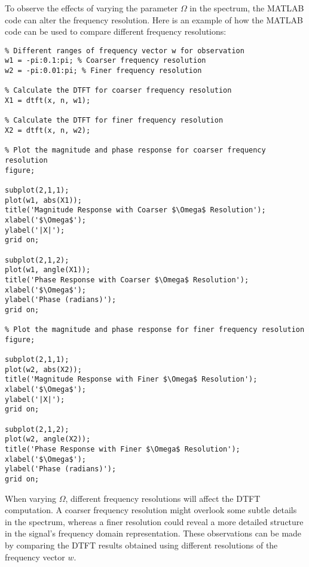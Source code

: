 
\item[(c)]
To observe the effects of varying the parameter $\Omega$ in the spectrum, the MATLAB code can alter the frequency resolution. Here is an example of how the MATLAB code can be used to compare different frequency resolutions:

\begin{verbatim}
% Different ranges of frequency vector w for observation
w1 = -pi:0.1:pi; % Coarser frequency resolution
w2 = -pi:0.01:pi; % Finer frequency resolution

% Calculate the DTFT for coarser frequency resolution
X1 = dtft(x, n, w1);

% Calculate the DTFT for finer frequency resolution
X2 = dtft(x, n, w2);

% Plot the magnitude and phase response for coarser frequency resolution
figure;

subplot(2,1,1);
plot(w1, abs(X1));
title('Magnitude Response with Coarser $\Omega$ Resolution');
xlabel('$\Omega$');
ylabel('|X|');
grid on;

subplot(2,1,2);
plot(w1, angle(X1));
title('Phase Response with Coarser $\Omega$ Resolution');
xlabel('$\Omega$');
ylabel('Phase (radians)');
grid on;

% Plot the magnitude and phase response for finer frequency resolution
figure;

subplot(2,1,1);
plot(w2, abs(X2));
title('Magnitude Response with Finer $\Omega$ Resolution');
xlabel('$\Omega$');
ylabel('|X|');
grid on;

subplot(2,1,2);
plot(w2, angle(X2));
title('Phase Response with Finer $\Omega$ Resolution');
xlabel('$\Omega$');
ylabel('Phase (radians)');
grid on;
\end{verbatim}

When varying $\Omega$, different frequency resolutions will affect the DTFT computation.
A coarser frequency resolution might overlook some subtle details in the spectrum,
whereas a finer resolution could reveal a more detailed structure in the signal's frequency domain representation.
These observations can be made by comparing the DTFT results obtained using different resolutions of the frequency vector $w$.
